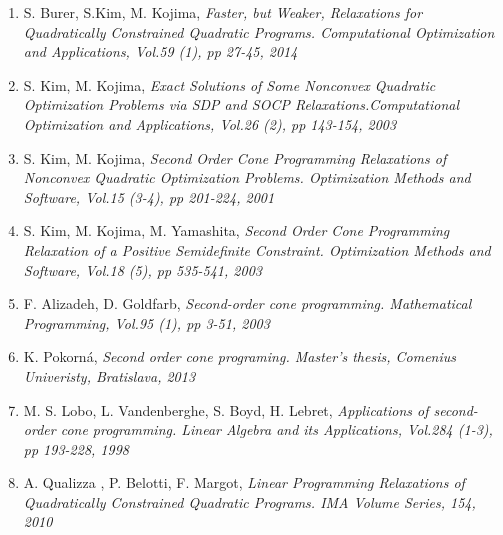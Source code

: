\documentclass[12pt]{book}
\theoremstyle{definition}
\begin{document}
\begin{enumerate}
\item S. Burer, S.Kim, M. Kojima, \it Faster, but Weaker, Relaxations for Quadratically Constrained Quadratic Programs. \rm Computational Optimization and Applications, Vol.59 (1), pp 27-45, 2014
\label{BurerKimKojimaFasterWeakerRelax}
%
\item S. Kim, M. Kojima, \it Exact Solutions of Some Nonconvex Quadratic Optimization Problems via SDP and SOCP Relaxations.\rm  Computational Optimization and Applications, Vol.26 (2), pp 143-154, 2003
\label{KimKojimaExactSolViaSDPandSOCP}
%
\item S. Kim, M. Kojima, \it Second Order Cone Programming Relaxations of Nonconvex Quadratic Optimization Problems. \rm Optimization Methods and Software, Vol.15 (3-4), pp 201-224, 2001 
\label{KimKojimaSOCPofNoncvxQOP}
%
\item S. Kim, M. Kojima, M. Yamashita, \it Second Order Cone Programming Relaxation of a Positive Semidefinite Constraint. \rm  Optimization Methods and Software, Vol.18 (5), pp 535-541, 2003
\label{KimKojimaSOCPRelaxOfPSDconstr}

%
\item F. Alizadeh, D. Goldfarb,  \it Second-order cone programming. \rm Mathematical Programming, Vol.95 (1), pp 3-51, 2003
\label{GoldfarbSOCP}
%
\item K. Pokorná, \it Second order cone programing. \rm  Master's thesis, Comenius Univeristy, Bratislava, 2013 
\label{PokornaSOCPDipl}
%
\item M. S. Lobo, L. Vandenberghe, S. Boyd, H. Lebret, \it Applications of second-order cone programming. \rm Linear Algebra and its Applications, Vol.284 (1-3), pp 193-228, 1998
\label{LoboVandApplicationsofSOCP}
%


\item A. Qualizza , P. Belotti, F. Margot, \it Linear Programming Relaxations of Quadratically Constrained Quadratic Programs. \rm 
IMA Volume Series, 154, 2010 
\label{MargotLPRelax}
%









\end{enumerate}
\end{document}
